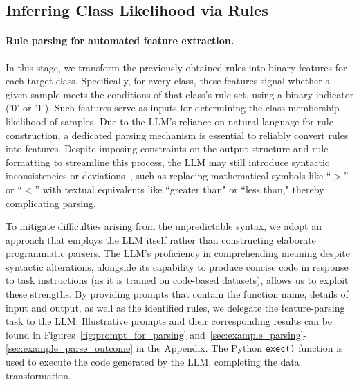 \subsection{Inferring Class Likelihood via Rules}
\label{Sec:training}

\paragraph{Rule parsing for automated feature extraction.} In this stage, we transform the previously obtained rules into binary features for each target class. Specifically, for every class, these features signal whether a given sample meets the conditions of that class’s rule set, using a binary indicator ('0' or '1'). Such features serve as inputs for determining the class membership likelihood of samples. Due to the LLM’s reliance on natural language for rule construction, a dedicated parsing mechanism is essential to reliably convert rules into features. Despite imposing constraints on the output structure and rule formatting to streamline this process, the LLM may still introduce syntactic inconsistencies or deviations~\cite{kovavc2023large}, such as replacing mathematical symbols like ``$>$” or ``$<$” with textual equivalents like ``greater than" or ``less than," thereby complicating parsing.

To mitigate difficulties arising from the unpredictable syntax, we adopt an approach that employs the LLM itself rather than constructing elaborate programmatic parsers. The LLM’s proficiency in comprehending meaning despite syntactic alterations, alongside its capability to produce concise code in response to task instructions (as it is trained on code-based datasets), allows us to exploit these strengths. By providing prompts that contain the function name, details of input and output, as well as the identified rules, we delegate the feature-parsing task to the LLM. Illustrative prompts and their corresponding results can be found in Figures~\ref{fig:prompt_for_parsing} and~\ref{sec:example_parsing}-\ref{sec:example_parse_outcome} in the Appendix. The Python \texttt{exec()} function is used to execute the code generated by the LLM, completing the data transformation.

\vspace*{-0.12in}
